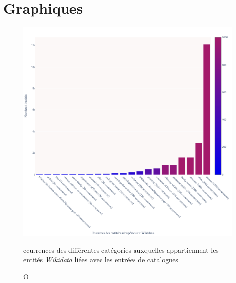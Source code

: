 \documentclass[a4paper, 12pt, twoside]{book}
\newcommand{\wkd}{\textit{Wikidata}}
\begin{document}
\chapter{Graphiques}
\begin{figure}
	\centering
	\includegraphics[width=\linewidth]{annexes/fig_wikidata_instances.png}
	\caption Occurrences des différentes catégories auxquelles appartiennent les entités \wkd{} liées avec les entrées de catalogues
	\label{appendix:wikidata_instances}
\end{figure}
\end{document}
